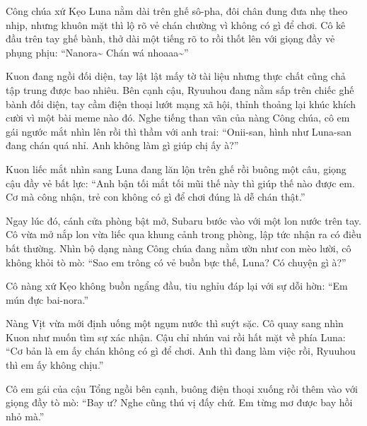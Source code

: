 \documentclass[../main.tex]{subfiles}
\begin{document}

Công chúa xứ Kẹo Luna nằm dài trên ghế sô-pha, đôi chân đung đưa nhẹ theo nhịp, nhưng khuôn mặt thì lộ rõ vẻ chán chường vì không có gì để chơi. Cô kê đầu trên tay ghế bành, thở dài một tiếng rõ to rồi thốt lên với giọng đầy vẻ phụng phịu: ``Nanora\~{} Chán wá nhoaaa\~{}''


Kuon đang ngồi đối diện, tay lật lật mấy tờ tài liệu nhưng thực chất cũng chả tập trung được bao nhiêu. Bên cạnh cậu, Ryuuhou đang nằm sấp trên chiếc ghế bành đối diện, tay cầm điện thoại lướt mạng xã hội, thỉnh thoảng lại khúc khích cười vì một bài meme nào đó. Nghe tiếng than vãn của nàng Công chúa, cô em gái ngước mắt nhìn lên rồi thì thầm với anh trai: ``Onii-san, hình như Luna-san đang chán quá nhỉ. Anh không làm gì giúp chị ấy à?''

Kuon liếc mắt nhìn sang Luna đang lăn lộn trên ghế rồi buông một câu, giọng cậu đầy vẻ bất lực: ``Anh bận tối mắt tối mũi thế này thì giúp thế nào được em. Cơ mà công nhận, trẻ con không có gì để chơi đúng là dễ chán thật.''

Ngay lúc đó, cánh cửa phòng bật mở, Subaru bước vào với một lon nước trên tay. Cô vừa mở nắp lon vừa liếc qua khung cảnh trong phòng, lập tức nhận ra có điều bất thường. Nhìn bộ dạng nàng Công chúa đang nằm ườn như con mèo lười, cô không khỏi tò mò: ``Sao em trông có vẻ buồn bực thế, Luna? Có chuyện gì à?''

Cô nàng xứ Kẹo không buồn ngẩng đầu, tiu nghỉu đáp lại với sự dỗi hờn: ``Em mún đực bai-nora.''

Nàng Vịt vừa mới định uống một ngụm nước thì suýt sặc. Cô quay sang nhìn Kuon như muốn tìm sự xác nhận. Cậu chỉ nhún vai rồi hất mặt về phía Luna: ``Cơ bản là em ấy chán không có gì để chơi. Anh thì đang làm việc rồi, Ryuuhou thì em ấy không chịu.''

Cô em gái của cậu Tổng ngồi bên cạnh, buông điện thoại xuống rồi thêm vào với giọng đầy tò mò: ``Bay ư? Nghe cũng thú vị đấy chứ. Em từng mơ được bay hồi nhỏ mà.''
\end{document}
